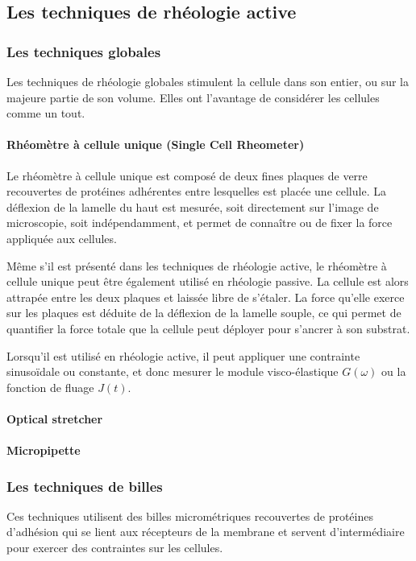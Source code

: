 \documentclass{report}
\begin{document}
\subsection{Les techniques de rhéologie active}
\subsubsection{Les techniques globales}
Les techniques de rhéologie globales stimulent la cellule dans son entier, ou sur la majeure partie de son volume. Elles ont l'avantage de considérer les cellules comme un tout. 

\paragraph{Rhéomètre à cellule unique (Single Cell Rheometer)}

Le rhéomètre à cellule unique est composé de deux fines plaques de verre recouvertes de protéines adhérentes entre lesquelles est placée une cellule. 
La déflexion de la lamelle du haut est mesurée, soit directement sur l'image de microscopie, soit indépendamment, et permet de connaître ou de fixer la force appliquée aux cellules. 

Même s'il est présenté dans les techniques de rhéologie active, le rhéomètre à cellule unique peut être également utilisé en rhéologie passive. 
La cellule est alors attrapée entre les deux plaques et laissée libre de s'étaler. La force qu'elle exerce sur les plaques est déduite de la déflexion de la lamelle souple, ce qui permet de quantifier la force totale que la cellule peut déployer pour s'ancrer à son substrat. 

Lorsqu'il est utilisé en rhéologie active, il peut appliquer une contrainte sinusoïdale ou constante, et donc mesurer le module visco-élastique $G(\omega)$ ou la fonction de fluage $J(t)$. 



\paragraph{Optical stretcher}
\paragraph{Micropipette}
\subsubsection{Les techniques de billes}
Ces techniques utilisent des billes micrométriques recouvertes de protéines d'adhésion qui se lient aux récepteurs de la membrane et servent d'intermédiaire pour exercer des contraintes sur les cellules. 
\end{document}
